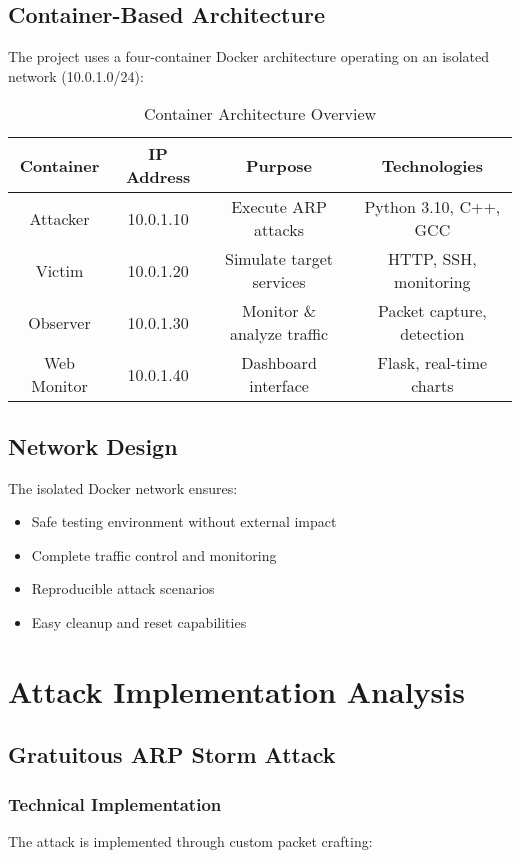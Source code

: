 \documentclass[12pt,a4paper]{article}
\begin{document}
\subsection{Container-Based Architecture}
The project uses a four-container Docker architecture operating on an isolated network (10.0.1.0/24):

\begin{table}[H]
\centering
\caption{Container Architecture Overview}
\begin{tabular}{|c|c|c|c|}
\hline
\textbf{Container} & \textbf{IP Address} & \textbf{Purpose} & \textbf{Technologies} \\
\hline
Attacker & 10.0.1.10 & Execute ARP attacks & Python 3.10, C++, GCC \\
\hline
Victim & 10.0.1.20 & Simulate target services & HTTP, SSH, monitoring \\
\hline
Observer & 10.0.1.30 & Monitor \& analyze traffic & Packet capture, detection \\
\hline
Web Monitor & 10.0.1.40 & Dashboard interface & Flask, real-time charts \\
\hline
\end{tabular}
\end{table}

\subsection{Network Design}
The isolated Docker network ensures:
\begin{itemize}
    \item Safe testing environment without external impact
    \item Complete traffic control and monitoring
    \item Reproducible attack scenarios
    \item Easy cleanup and reset capabilities
\end{itemize}

\section{Attack Implementation Analysis}

\subsection{Gratuitous ARP Storm Attack}

\subsubsection{Technical Implementation}
The attack is implemented through custom packet crafting:
\end{document}
